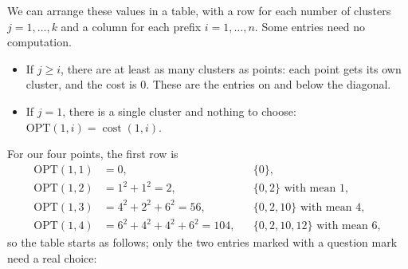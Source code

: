 \documentclass[a4paper,12pt,oneside]{report}
\newcommand{\OPT}{\mathrm{OPT}}
\begin{document}
We can arrange these values in a table, with a row for each number of
clusters $j=1,\ldots,k$ and a column for each prefix $i=1,\ldots,n$.
Some entries need no computation.
\begin{itemize}
  \item If $j\geq i$, there are at least as many clusters as points:
    each point gets its own cluster, and the cost is $0$. These are the
    entries on and below the diagonal.
  \item If $j=1$, there is a single cluster and nothing to choose:
    $\OPT(1,i)=\operatorname{cost}(1,i)$.
\end{itemize}
For our four points, the first row is
\[
\begin{aligned}
  \OPT(1,1)&=0, &&\{0\},\\
  \OPT(1,2)&=1^2+1^2=2, &&\{0,2\}\text{ with mean }1,\\
  \OPT(1,3)&=4^2+2^2+6^2=56, &&\{0,2,10\}\text{ with mean }4,\\
  \OPT(1,4)&=6^2+4^2+4^2+6^2=104, &&\{0,2,10,12\}\text{ with mean }6,
\end{aligned}
\]
so the table starts as follows; only the two entries marked with a
question mark need a real choice:

\newcommand{\dpcell}[5]{%
  \fill[#3] (#1-1,-#2+1) rectangle (#1,-#2);
  \node at (#1-0.5,-#2+0.55) {$#4$};
  \node[font=\scriptsize,gray!80!black,anchor=south east,inner sep=1.5pt]
    at (#1,-#2) {#5};}
\newcommand{\dpgrid}{%
  \foreach \x in {0,...,4} \draw[gray!70] (\x,0) -- (\x,-2);
  \foreach \y in {0,1,2} \draw[gray!70] (0,-\y) -- (4,-\y);
  \foreach \i in {1,...,4}
    \node[gray!80!black] at (\i-0.5,0.35) {$i=\i$};
  \foreach \j in {1,2}
    \node[anchor=east] at (-0.1,-\j+0.5) {$j=\j$};}
\begin{center}
\end{center}
\end{document}
